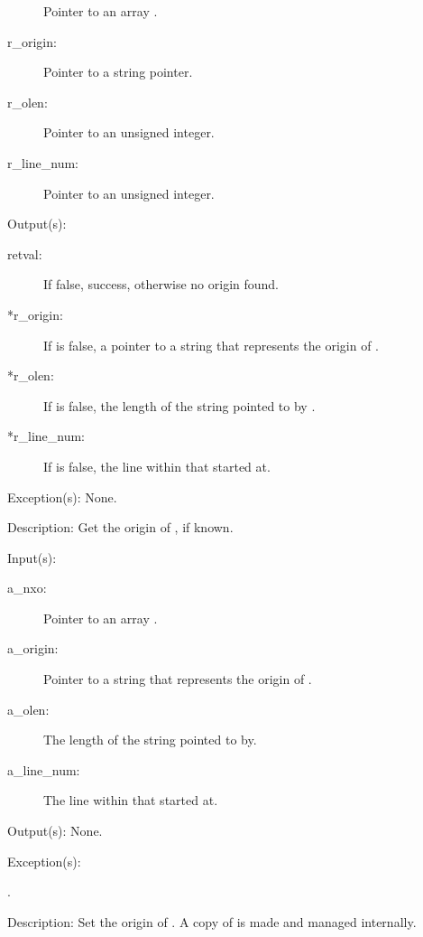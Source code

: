 \begin{capi}
\begin{capilist}
\begin{description}
			Pointer to an array .
		\item[r\_origin: ] Pointer to a string pointer.
		\item[r\_olen: ] Pointer to an unsigned integer.
		\item[r\_line\_num: ] Pointer to an unsigned integer.
		\end{description}
	\item[Output(s): ]
		\begin{description}\item[]
		\item[retval: ] If false, success, otherwise no origin found.
		\item[*r\_origin: ]
			If  is false, a pointer to a string that
			represents the origin of .
		\item[*r\_olen: ]
			If  is false, the length of the string
			pointed to by .
		\item[*r\_line\_num: ]
			If  is false, the line within
			 that  started at.
		\end{description}
	\item[Exception(s): ] None.
	\item[Description: ]
		Get the origin of , if known.
	\end{capilist}
\label{nxo_array_origin_set}
	\begin{capilist}
	\item[Input(s): ]
		\begin{description}\item[]
		\item[a\_nxo: ]
			Pointer to an array .
		\item[a\_origin: ]
			Pointer to a string that represents the origin of
			.
		\item[a\_olen: ]
			The length of the string pointed to by.
		\item[a\_line\_num: ]
			The line within  that 
			started at.
		\end{description}
	\item[Output(s): ] None.
	\item[Exception(s): ]
		\begin{description}\item[]
		\item[.]
		\end{description}
	\item[Description: ]
		Set the origin of .  A copy of  is
		made and managed internally.
	\end{capilist}
\end{capi}
